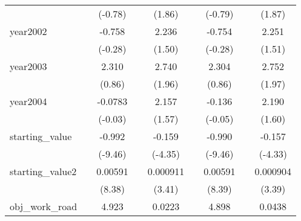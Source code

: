 {\begin{tabular}{l*{8}{c}}
            &                     &     (-0.78)         &                     &      (1.86)         &                     &     (-0.79)         &                     &      (1.87)         \\
[1em]
year2002    &                     &      -0.758         &                     &       2.236         &                     &      -0.754         &                     &       2.251         \\
            &                     &     (-0.28)         &                     &      (1.50)         &                     &     (-0.28)         &                     &      (1.51)         \\
[1em]
year2003    &                     &       2.310         &                     &       2.740         &                     &       2.304         &                     &       2.752\sym{*}  \\
            &                     &      (0.86)         &                     &      (1.96)         &                     &      (0.86)         &                     &      (1.97)         \\
[1em]
year2004    &                     &     -0.0783         &                     &       2.157         &                     &      -0.136         &                     &       2.190         \\
            &                     &     (-0.03)         &                     &      (1.57)         &                     &     (-0.05)         &                     &      (1.60)         \\
[1em]
starting\_value&                     &      -0.992\sym{***}&                     &      -0.159\sym{***}&                     &      -0.990\sym{***}&                     &      -0.157\sym{***}\\
            &                     &     (-9.46)         &                     &     (-4.35)         &                     &     (-9.46)         &                     &     (-4.33)         \\
[1em]
starting\_value2&                     &     0.00591\sym{***}&                     &    0.000911\sym{***}&                     &     0.00591\sym{***}&                     &    0.000904\sym{***}\\
            &                     &      (8.38)         &                     &      (3.41)         &                     &      (8.39)         &                     &      (3.39)         \\
[1em]
obj\_work\_road&                     &       4.923\sym{***}&                     &      0.0223         &                     &       4.898\sym{***}&                     &      0.0438         \\

\end{tabular}}
